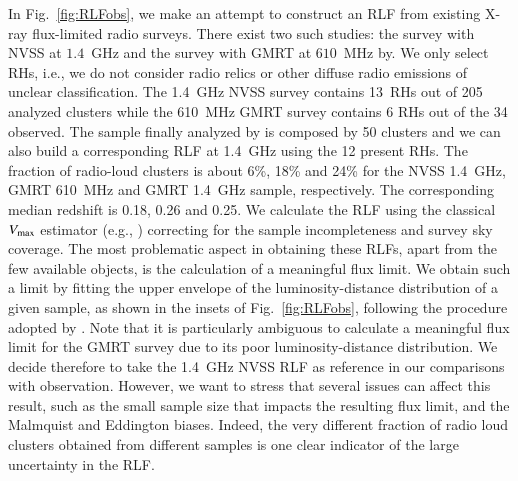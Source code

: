 \documentclass[useAMS,usenatbib]{mn2e}
\begin{document}
\begin{appendix}
In Fig.~\ref{fig:RLFobs}, we make an attempt to construct an RLF from existing
X-ray flux-limited radio surveys. There exist two such studies: the
\cite{1999NewA....4..141G} survey with NVSS at $1.4$~GHz and the
\cite{VenturiGMRT_1,VenturiGMRT_2} survey with GMRT at $610$~MHz by. We only
select RHs, i.e., we do not consider radio relics or other diffuse radio
emissions of unclear classification. The 1.4~GHz NVSS survey contains 13~RHs out
of 205 analyzed clusters while the 610~MHz GMRT survey contains 6 RHs out of the
34 observed. The sample finally analyzed by \cite{VenturiGMRT_1,VenturiGMRT_2}
is composed by 50 clusters and we can also build a corresponding RLF at 1.4~GHz
using the 12 present RHs. The fraction of radio-loud clusters is about 6\%, 18\%
and 24\% for the NVSS 1.4~GHz, GMRT 610~MHz and GMRT 1.4~GHz sample,
respectively. The corresponding median redshift is 0.18, 0.26 and 0.25. We
calculate the RLF using the classical $V_{{\mathrm{max}}}$ estimator (e.g.,
\citealp{1976ApJ...207..700F}) correcting for the sample incompleteness and
survey sky coverage. The most problematic aspect in obtaining these RLFs, apart
from the few available objects, is the calculation of a meaningful flux
limit. We obtain such a limit by fitting the upper envelope of the
luminosity-distance distribution of a given sample, as shown in the insets of
Fig.~\ref{fig:RLFobs}, following the procedure adopted by
\cite{2011arXiv1106.5494B}. Note that it is particularly ambiguous to calculate
a meaningful flux limit for the GMRT survey due to its poor luminosity-distance
distribution. We decide therefore to take the 1.4~GHz NVSS RLF as reference in
our comparisons with observation. However, we want to stress that several issues
can affect this result, such as the small sample size that impacts the resulting
flux limit, and the Malmquist and Eddington biases. Indeed, the very different
fraction of radio loud clusters obtained from different samples is one clear
indicator of the large uncertainty in the RLF.


\end{appendix}
\end{document}
